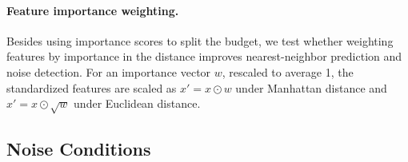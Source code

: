 \paragraph{Feature importance weighting.}

Besides using importance scores to split the budget, we test whether weighting features by importance in the distance improves nearest-neighbor prediction and noise detection. For an importance vector $w$, rescaled to average 1, the standardized features are scaled as $x' = x \odot w$ under Manhattan distance and $x' = x \odot \sqrt{w}$ under Euclidean distance.


\subsection{Noise Conditions}
